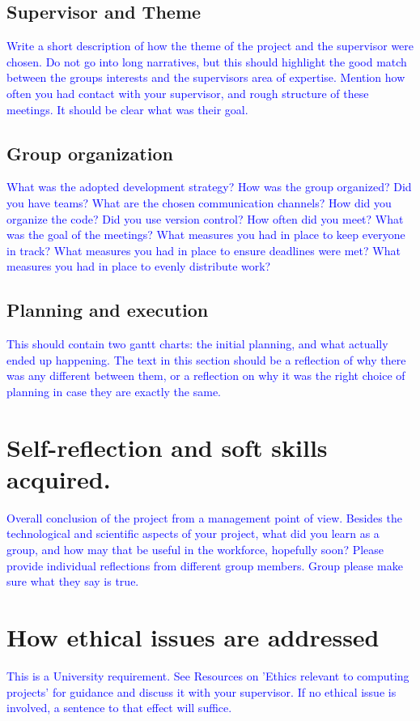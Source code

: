 \documentclass[acmtog, nonacm]{acmart}
\begin{document}
\subsection{Supervisor and Theme}
\textcolor{blue}{Write a short description of how the theme of the project and the supervisor were chosen.
Do not go into long narratives, but this should highlight the good match between the groups interests and the supervisors area of expertise.
Mention how often you had contact with your supervisor, and rough structure of these meetings. 
It should be clear what was their goal. }

\subsection{Group organization}
\textcolor{blue}{What was the adopted development strategy?
How was the group organized? 
Did you have teams?
What are the chosen communication channels? 
How did you organize the code? 
Did you use version control? 
How often did you meet? 
What was the goal of the meetings? 
What measures you had in place to keep everyone in track?
What measures you had in place to ensure deadlines were met?
What measures you had in place to evenly distribute work?}

\subsection{Planning and execution}
\textcolor{blue}{This should contain two gantt charts: the initial planning, and what actually ended up happening.
The text in this section should be a reflection of why there was any different between them, or a reflection on why it was the right choice of planning in case they are exactly the same. }

\section{Self-reflection and soft skills acquired.}
\textcolor{blue}{Overall conclusion of the project from a management point of view. 
Besides the technological and scientific aspects of your project, what did you learn as a group, and how may that be useful in the workforce, hopefully soon? Please provide individual reflections from different group members. Group please make sure what they say is true.}

\section{How ethical issues are addressed}
\textcolor{blue}{This is a University requirement. See Resources on 'Ethics relevant to computing projects' for guidance and discuss it with your supervisor. If no ethical issue is involved, a sentence to that effect will suffice.}
\end{document}
